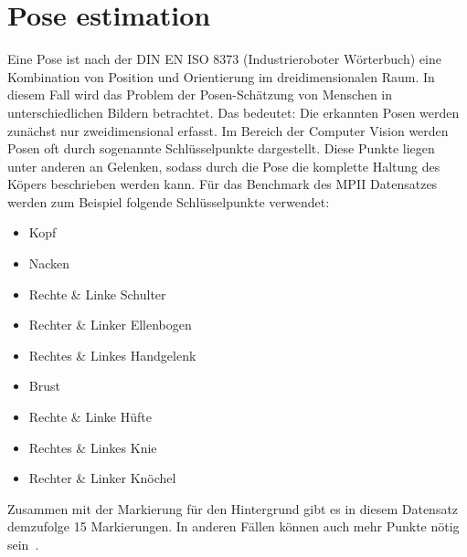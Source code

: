 \documentclass[journal, a4paper]{IEEEtran}
\begin{document}
\section{Pose estimation} \label{sec:pose_estimation}
	Eine Pose ist nach der DIN EN ISO 8373 (Industrieroboter Wörterbuch) eine Kombination von Position und Orientierung im dreidimensionalen Raum. In diesem Fall wird das Problem der Posen-Schätzung von Menschen in unterschiedlichen Bildern betrachtet. Das bedeutet: Die erkannten Posen werden zunächst nur zweidimensional erfasst. Im Bereich der Computer Vision werden Posen oft durch sogenannte Schlüsselpunkte dargestellt. Diese Punkte liegen unter anderen an Gelenken, sodass durch die Pose die komplette Haltung des Köpers beschrieben werden kann.
        Für das Benchmark des MPII Datensatzes~\cite{MPII} 
        werden zum Beispiel folgende Schlüsselpunkte verwendet:
        \begin{itemize}
        \item Kopf 
        \item Nacken
        \item Rechte \& Linke Schulter
        \item Rechter \& Linker Ellenbogen
        \item Rechtes \& Linkes Handgelenk
        \item Brust
        \item Rechte \& Linke Hüfte
        \item Rechtes \& Linkes Knie
        \item Rechter \& Linker Knöchel
        \end{itemize}
        Zusammen mit der Markierung für den Hintergrund gibt es in diesem Datensatz demzufolge 15 Markierungen. In anderen Fällen können auch mehr Punkte nötig sein~\cite{lin2014microsoft}.
\end{document}
